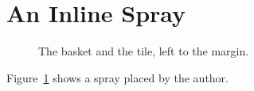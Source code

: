 \documentclass[11pt]{article}
\providecommand\KachoSprayCmd{\kachospray[width=0.6\linewidth,height=45mm,seed=7]}
\providecommand\KachoSprayCmdB{}
\begin{document}
\section{An Inline Spray}
\lipsum[1]
\begin{figure}[!htbp]
  \centering
  \KachoSprayCmd
  \caption{The basket and the tile, left to the margin.}
  \label{fig:spray}
\end{figure}
\lipsum[2]

\begin{center}
\KachoSprayCmdB
\end{center}
Figure~\ref{fig:spray} shows a spray placed by the author.
\lipsum[3]
\end{document}
